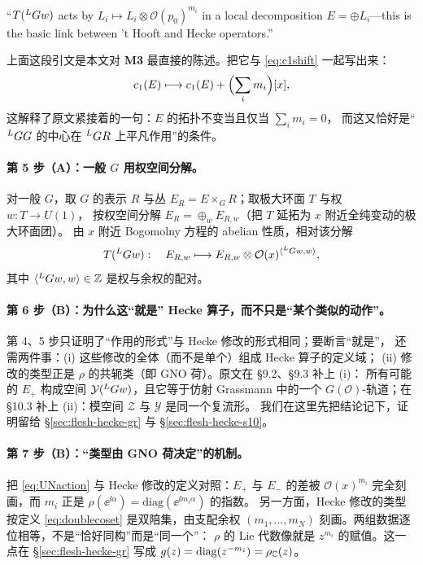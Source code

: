 \begin{origquote}
“$T({}^{L}G w)$ acts by $L_i\mapsto L_i\otimes\mathcal{O}(p_0)^{m_i}$ in a local decomposition $E=\oplus L_i$---this is the basic link between 't Hooft{} and Hecke operators.”
\end{origquote}

上面这段引文是本文对 \textbf{M3} 最直接的陈述。把它与
\eqref{eq:c1shift} 一起写出来：
\begin{equation}
c_1(E)\longmapsto c_1(E)+\Bigl(\sum_i m_i\Bigr)[x],
\label{eq:c1shift}
\end{equation}
这解释了原文紧接着的一句：$E$ 的拓扑不变当且仅当 $\sum_im_i=0$，
而这又恰好是“${}^{L}G G$ 的中心在 ${}^{L}G R$ 上平凡作用”的条件。\pA{}

\paragraph{第 5 步（A）：一般 $G$ 用权空间分解。}
对一般 $G$，取 $G$ 的表示 $R$ 与丛 $E_R=E\times_GR$；取极大环面 $T$ 与权 $w:T\to U(1)$，
按权空间分解 $E_R=\oplus_wE_{R,w}$（把 $T$ 延拓为 $x$ 附近全纯变动的极大环面团）。
由 $x$ 附近 Bogomolny 方程的 abelian 性质，相对该分解
\begin{equation}
T({}^{L}G w):\quad E_{R,w}\longmapsto E_{R,w}\otimes\mathcal{O}(x)^{\langle{}^{L}G w,w\rangle},
\label{eq:weightaction}
\end{equation}
其中 $\langle{}^{L}G w,w\rangle\in\mathbb{Z}$ 是权与余权的配对。\pA{}

\paragraph{第 6 步（B）：为什么这“就是” Hecke 算子，而不只是“某个类似的动作”。}
第 4、5 步只证明了“作用的形式”与 Hecke 修改的形式相同；要断言“就是”，
还需两件事：(i) 这些修改的全体（而不是单个）组成 Hecke 算子的定义域；
(ii) 修改的类型正是 $\rho$ 的共轭类（即 GNO 荷）。原文在 §9.2、§9.3 补上 (i)：
所有可能的 $E_+$ 构成空间 $\mathcal{Y}({}^{L}G w)$，且它等于仿射 Grassmann 中的一个
$G(\mathcal{O})$-轨道；在 §10.3 补上 (ii)：模空间 $\mathcal{Z}$ 与 $\mathcal{Y}$ 是同一个复流形。
我们在这里先把结论记下，证明留给 §\ref{sec:flesh-hecke-gr} 与 §\ref{sec:flesh-hecke-s10}。
\pB{}

\paragraph{第 7 步（B）：“类型由 GNO 荷决定”的机制。}
把 \eqref{eq:UNaction} 与 Hecke 修改的定义对照：$E_+$ 与 $E_-$ 的差被 $\mathcal{O}(x)^{m_i}$
完全刻画，而 $m_i$ 正是 $\rho(\ee^{\ii\alpha})=\mathrm{diag}(\ee^{\ii m_i\alpha})$ 的指数。
另一方面，Hecke 修改的类型按定义 \eqref{eq:doublecoset} 是双陪集，由支配余权
$(m_1,\dots,m_N)$ 刻画。两组数据逐位相等，不是“恰好同构”而是“同一个”：
$\rho$ 的 Lie 代数像就是 $z^{m_i}$ 的赋值。这一点在 §\ref{sec:flesh-hecke-gr} 写成
$g(z)=\mathrm{diag}(z^{-m_i})=\rho_{\mathbb{C}}(z)$。\pB{}

